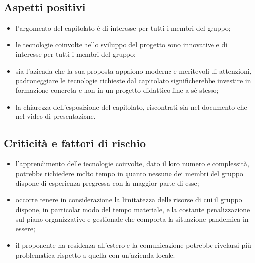\subsection{Aspetti positivi}
\begin{itemize}
    \item l’argomento del capitolato è di interesse per tutti i membri del gruppo;
    \item le tecnologie coinvolte nello sviluppo del progetto sono innovative e di interesse per tutti i membri del gruppo;
    \item sia l’azienda che la sua proposta appaiono moderne e meritevoli di attenzioni, padroneggiare le tecnologie richieste dal capitolato significherebbe investire in formazione concreta e non in un progetto didattico fine a sé stesso;
    \item la chiarezza dell’esposizione del capitolato, riscontrati sia nel documento che nel video di presentazione.
\end{itemize}
\subsection{Criticità e fattori di rischio}
\begin{itemize}
    \item l’apprendimento delle tecnologie coinvolte, dato il loro numero e complessità, potrebbe richiedere molto tempo in quanto nessuno dei membri del gruppo dispone di esperienza pregressa con la maggior parte di esse;
    \item occorre tenere in considerazione la limitatezza delle risorse di cui il gruppo dispone, in particolar modo del tempo materiale, e la costante penalizzazione sul piano organizzativo e gestionale che comporta la situazione pandemica in essere;
    \item il proponente ha residenza all’estero e la comunicazione potrebbe rivelarsi più problematica rispetto a quella con un’azienda locale.
\end{itemize}
